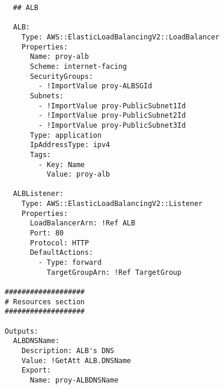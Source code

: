 \begin{verbatim}
  ## ALB

  ALB:
    Type: AWS::ElasticLoadBalancingV2::LoadBalancer
    Properties:
      Name: proy-alb
      Scheme: internet-facing
      SecurityGroups:
        - !ImportValue proy-ALBSGId
      Subnets:
        - !ImportValue proy-PublicSubnet1Id
        - !ImportValue proy-PublicSubnet2Id
        - !ImportValue proy-PublicSubnet3Id
      Type: application
      IpAddressType: ipv4
      Tags:
        - Key: Name
          Value: proy-alb

  ALBListener:
    Type: AWS::ElasticLoadBalancingV2::Listener
    Properties:
      LoadBalancerArn: !Ref ALB
      Port: 80
      Protocol: HTTP
      DefaultActions:
        - Type: forward
          TargetGroupArn: !Ref TargetGroup

###################
# Resources section
###################

Outputs:
  ALBDNSName:
    Description: ALB's DNS
    Value: !GetAtt ALB.DNSName
    Export:
      Name: proy-ALBDNSName
\end{verbatim}
